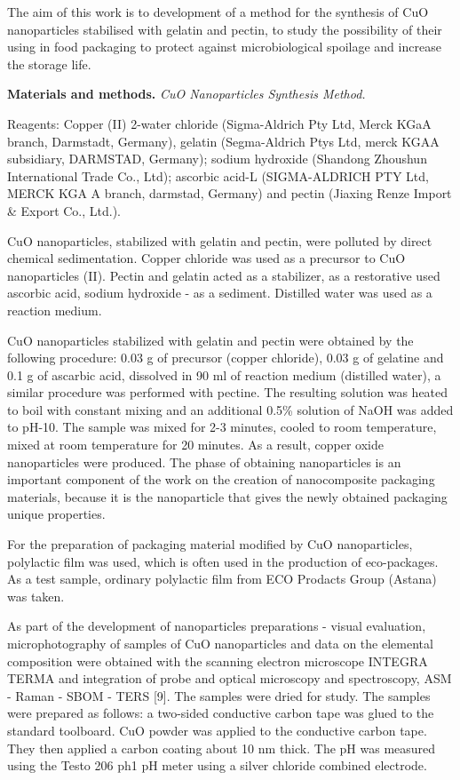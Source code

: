 The aim of this work is to development of a method for the synthesis of
CuO nanoparticles stabilised with gelatin and pectin, to study the
possibility of their using in food packaging to protect against
microbiological spoilage and increase the storage life.

{\bfseries Materials and methods.} \emph{CuO Nanoparticles Synthesis
Method.}

Reagents: Copper (II) 2-water chloride (Sigma-Aldrich Pty Ltd, Merck
KGaA branch, Darmstadt, Germany), gelatin (Segma-Aldrich Ptys Ltd, merck
KGAA subsidiary, DARMSTAD, Germany); sodium hydroxide (Shandong Zhoushun
International Trade Co., Ltd); ascorbic acid-L (SIGMA-ALDRICH PTY Ltd,
MERCK KGA A branch, darmstad, Germany) and pectin (Jiaxing Renze Import
\& Export Co., Ltd.).

CuO nanoparticles, stabilized with gelatin and pectin, were polluted by
direct chemical sedimentation. Copper chloride was used as a precursor
to CuO nanoparticles (II). Pectin and gelatin acted as a stabilizer, as
a restorative used ascorbic acid, sodium hydroxide - as a sediment.
Distilled water was used as a reaction medium.

CuO nanoparticles stabilized with gelatin and pectin were obtained by
the following procedure: 0.03 g of precursor (copper chloride), 0.03 g
of gelatine and 0.1 g of ascarbic acid, dissolved in 90 ml of reaction
medium (distilled water), a similar procedure was performed with
pectine. The resulting solution was heated to boil with constant mixing
and an additional 0.5\% solution of NaOH was added to pH-10. The sample
was mixed for 2-3 minutes, cooled to room temperature, mixed at room
temperature for 20 minutes. As a result, copper oxide nanoparticles were
produced. The phase of obtaining nanoparticles is an important component
of the work on the creation of nanocomposite packaging materials,
because it is the nanoparticle that gives the newly obtained packaging
unique properties.

For the preparation of packaging material modified by CuO nanoparticles,
polylactic film was used, which is often used in the production of
eco-packages. As a test sample, ordinary polylactic film from ECO
Prodacts Group (Astana) was taken.

As part of the development of nanoparticles preparations - visual
evaluation, microphotography of samples of CuO nanoparticles and data on
the elemental composition were obtained with the scanning electron
microscope INTEGRA TERMA and integration of probe and optical microscopy
and spectroscopy, ASM - Raman - SBOM - TERS {[}9{]}. The samples were
dried for study. The samples were prepared as follows: a two-sided
conductive carbon tape was glued to the standard toolboard. CuO powder
was applied to the conductive carbon tape. They then applied a carbon
coating about 10 nm thick. The pH was measured using the Testo 206 ph1
pH meter using a silver chloride combined electrode.

